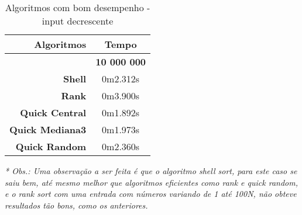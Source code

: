 \documentclass[
	12pt,				%
	oneside,			%
	a4paper,			%
	english,			%
	brazil,				%
	]{article}
\begin{document}
\begin{table}[H]
\centering
\begin{tabular}{|r|c|}
\cline{1-2} 
  \textbf{Algoritmos} & \textbf{Tempo}  \\
 \hline
 \textbf{} & \textbf{10 000 000} \\
 \hline
 \textbf{Shell} & 0m2.312s \\
 \hline
 \textbf{Rank} & 0m3.900s  \\
 \hline
 \textbf{Quick Central} & 0m1.892s \\
 \hline
 \textbf{Quick Mediana3} & 0m1.973s  \\
 \hline
 \textbf{Quick Random} & 0m2.360s  \\
 \hline
\end{tabular} 
\caption{Algoritmos com bom desempenho - input decrescente}
\end{table}
\textit{* Obs.: Uma observação a ser feita é que o algoritmo shell sort, para este caso se saiu bem, até mesmo melhor que algoritmos eficientes como rank e quick random, e o rank sort com uma entrada
com números variando de 1 até 100N, não obteve resultados tão bons, como os anteriores.}
\end{document}
